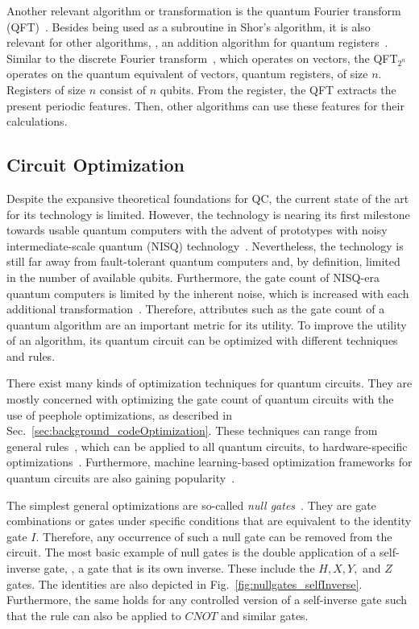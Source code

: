 Another relevant algorithm or transformation is the quantum Fourier transform (QFT)~\cite{Copp02}. Besides being used as a subroutine in Shor's algorithm, it is also relevant for other algorithms, \eg, an addition algorithm for quantum registers~\cite{Drap00}. Similar to the discrete Fourier transform~\cite{Wino78}, which operates on vectors, the QFT$_{2^n}$ operates on the quantum equivalent of vectors, quantum registers, of size $n$. Registers of size $n$ consist of $n$ qubits. From the register, the QFT extracts the present periodic features. Then, other algorithms can use these features for their calculations.

\subsection{Circuit Optimization}
\label{sec:background_circuitOptimization}
Despite the expansive theoretical foundations for QC, the current state of the art for its technology is limited. However, the technology is nearing its first milestone towards usable quantum computers with the advent of prototypes with noisy intermediate-scale quantum (NISQ) technology~\cite{BFA22}. Nevertheless, the technology is still far away from fault-tolerant quantum computers and, by definition, limited in the number of available qubits. Furthermore, the gate count of NISQ-era quantum computers is limited by the inherent noise, which is increased with each additional transformation~\cite{Pres18}. Therefore, attributes such as the gate count of a quantum algorithm are an important metric for its utility. To improve the utility of an algorithm, its quantum circuit can be optimized with different techniques and rules.

There exist many kinds of optimization techniques for quantum circuits. They are mostly concerned with optimizing the gate count of quantum circuits with the use of peephole optimizations, as described in Sec.~\ref{sec:background_codeOptimization}. These techniques can range from general rules~\cite{GaCh11, LBZ21}, which can be applied to all quantum circuits, to hardware-specific optimizations~\cite{KMO*23}. Furthermore, machine learning-based optimization frameworks for quantum circuits are also gaining popularity~\cite{FNML21,LPM*24, RLB*24}.

The simplest general optimizations are so-called \emph{null gates}~\cite{GaCh11}. They are gate combinations or gates under specific conditions that are equivalent to the identity gate $I$. Therefore, any occurrence of such a null gate can be removed from the circuit. The most basic example of null gates is the double application of a self-inverse gate, \ie, a gate that is its own inverse. These include the $H, X, Y,$ and $Z$ gates. The identities are also depicted in Fig.~\ref{fig:nullgates_selfInverse}.
Furthermore, the same holds for any controlled version of a self-inverse gate such that the rule can also be applied to $CNOT$ and similar gates. 

